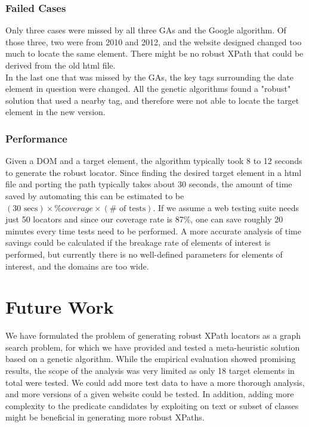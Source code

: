 \documentclass[format=acmlarge, nonacm=true]{acmart}
\begin{document}
\subsubsection{Failed Cases}
Only three cases were missed by all three GAs and the Google algorithm. Of those three, two were from 2010 and 2012, and the website designed changed too much to locate the same element. There might be no robust XPath that could be derived from the old html file.\\

In the last one that was missed by the GAs, the key tags surrounding the date element in question were changed. All the genetic algorithms found a "robust" solution that used a nearby tag, and therefore were not able to locate the target element in the new version.\\

\subsubsection{Performance}
Given a DOM and a target element, the algorithm typically took 8 to 12 seconds to generate the robust locator. Since finding the desired target element in a html file and porting the path typically takes about 30 seconds, the amount of time saved by automating this can be estimated to be $(30\text{ secs})\times \%coverage\times (\#\text{ of tests})$. If we assume a web testing suite needs just 50 locators and since our coverage rate is 87\%, one can save roughly 20 minutes every time tests need to be performed. A more accurate analysis of time savings could be calculated if the breakage rate of elements of interest is performed, but currently there is no well-defined parameters for elements of interest, and the domains are too wide.


\section{Future Work}
We have formulated the problem of generating robust XPath locators as a graph search problem, for which we have provided and tested a meta-heuristic solution based on a genetic algorithm. While the empirical evaluation showed promising results, the scope of the analysis was very limited as only 18 target elements in total were tested. We could add more test data to have a more thorough analysis, and more versions of a given website could be tested. In addition, adding more complexity to the predicate candidates by exploiting on text or subset of classes might be beneficial in generating more robust XPaths.\\ 
\end{document}
